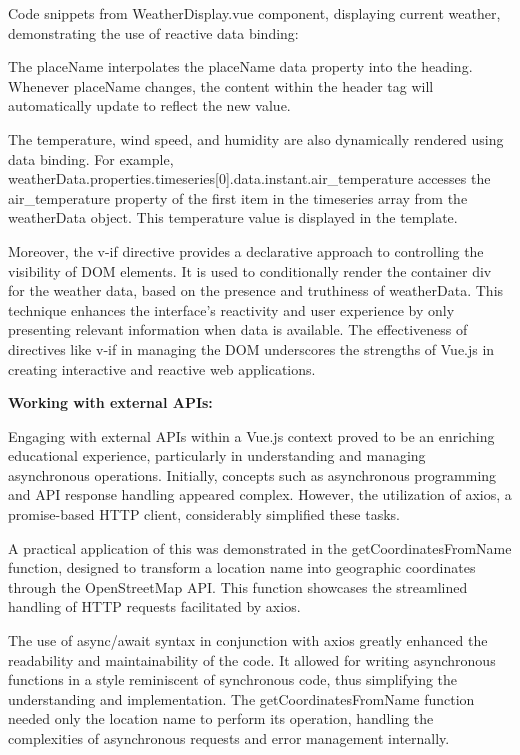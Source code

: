 Code snippets from WeatherDisplay.vue component, displaying current weather, demonstrating the use of reactive data binding: 



The {{ placeName }} interpolates the placeName data property into the heading. Whenever placeName changes, the content within the header tag will automatically update to reflect the new value.

The temperature, wind speed, and humidity are also dynamically rendered using data binding. 
For example, {{ weatherData.properties.timeseries[0].data.instant.air_temperature }} accesses the air_temperature property of the first item in the timeseries array from the weatherData object. This temperature value is displayed in the template.

Moreover, the v-if directive provides a declarative approach to controlling the visibility of DOM elements. It is used to conditionally render the container div for the weather data, based on the presence and truthiness of weatherData. This technique enhances the interface's reactivity and user experience by only presenting relevant information when data is available. The effectiveness of directives like v-if in managing the DOM underscores the strengths of Vue.js in creating interactive and reactive web applications.

\textbf{Working with external APIs:}

Engaging with external APIs within a Vue.js context proved to be an enriching educational experience, particularly in understanding and managing asynchronous operations. Initially, concepts such as asynchronous programming and API response handling appeared complex. However, the utilization of axios, a promise-based HTTP client, considerably simplified these tasks.

A practical application of this was demonstrated in the getCoordinatesFromName function, designed to transform a location name into geographic coordinates through the OpenStreetMap API. This function showcases the streamlined handling of HTTP requests facilitated by axios.



The use of async/await syntax in conjunction with axios greatly enhanced the readability and maintainability of the code. It allowed for writing asynchronous functions in a style reminiscent of synchronous code, thus simplifying the understanding and implementation. The getCoordinatesFromName function needed only the location name to perform its operation, handling the complexities of asynchronous requests and error management internally.

